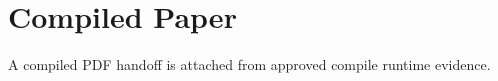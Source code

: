 \section{Compiled Paper}
A compiled PDF handoff is attached from approved compile runtime evidence.
